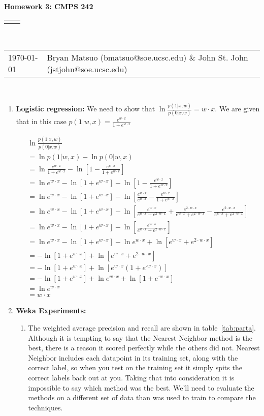 \documentclass[12pt]{article}
\renewcommand{\title}[1]{\textbf{#1}\\}
\renewcommand{\line}{\begin{tabularx}{\textwidth}{X>{\raggedleft}X}\hline\\\end{tabularx}\\[-0.5cm]}
\newcommand{\leftright}[2]{\begin{tabularx}{\textwidth}{X>{\raggedleft}X}#1%
& #2\\\end{tabularx}\\[-0.5cm]}
\begin{document}
\title{Homework 3: CMPS 242}
\line
\leftright{\today}{Bryan Matsuo (bmatsuo@soe.ucsc.edu) \& John St. John (jstjohn@soe.ucsc.edu)} %
\begin{enumerate}
\item \textbf{Logistic regression:}
We need to show that $\ln \frac{p(1|x,w)}{p(0|x.w)}=w\cdot x$. We are given that in this case $p(1|w,x) = \frac{e^{w\cdot x}}{1+e^{w \cdot x}}$

\begin{eqnarray*}
\ln \frac{p(1|x,w)}{p(0|x.w)} \\
= \ln p(1|w,x) - \ln p(0|w,x) \\
=  \ln \frac{e^{w\cdot x}}{1+e^{w \cdot x}} - \ln \left[ 1-\frac{e^{w\cdot x}}{1+e^{w \cdot x}}\right] \\
=\ln e^{w\cdot x} - \ln \left[ 1 + e^{w\cdot x} \right] -\ln \left[ 1-\frac{e^{w\cdot x}}{1+e^{w \cdot x}}\right] \\
=\ln e^{w\cdot x} - \ln \left[ 1 + e^{w\cdot x} \right] -\ln \left[ \frac{e^{w\cdot x}}{e^{w\cdot x}}-\frac{e^{w\cdot x}}{1+e^{w \cdot x}}\right] \\
=\ln e^{w\cdot x} - \ln \left[ 1 + e^{w\cdot x} \right] -\ln \left[ \frac{e^{w\cdot x}}{e^{w\cdot x}+e^{2\cdot w\cdot x}}+ \frac{e^{2\cdot w\cdot x}}{e^{w\cdot x}+e^{2\cdot w\cdot x}}-\frac{e^{2\cdot w\cdot x}}{e^{w\cdot x}+e^{2\cdot w\cdot x}}\right] \\
=\ln e^{w\cdot x} - \ln \left[ 1 + e^{w\cdot x} \right] -\ln \left[ \frac{e^{w\cdot x}}{e^{w\cdot x}+e^{2\cdot w\cdot x}}\right] \\
=\ln e^{w\cdot x} - \ln \left[ 1 + e^{w\cdot x} \right] -\ln e^{w\cdot x} + \ln \left[ e^{w\cdot x}+e^{2\cdot w\cdot x} \right] \\
= - \ln \left[ 1 + e^{w\cdot x} \right] +  \ln \left[ e^{w\cdot x}+e^{2\cdot w\cdot x} \right] \\
= - \ln \left[ 1 + e^{w\cdot x} \right] + \ln \left[ e^{w\cdot x}\left(1+e^{\cdot w\cdot x}\right) \right]\\
= - \ln \left[ 1 + e^{w\cdot x} \right] + \ln e^{w\cdot x} + \ln \left[1+e^{\cdot w\cdot x}\right] \\
=\ln e^{w\cdot x}\\
= w\cdot x
\end{eqnarray*}


\item \textbf{Weka Experiments: }

\begin{enumerate}
\item %
The weighted average precision and recall are shown in table~\ref{tab:parta}. Although it is tempting to say that the Nearest Neighbor method is the best, there is a reason it scored perfectly while the others did not. Nearest Neighbor includes each datapoint in its training set, along with the correct label, so when you test on the training set it simply spits the correct labels back out at you. Taking that into consideration it is impossible to say which method was the best. We'll need to evaluate the methods on a different set of data than was used to train to compare the techniques.



\end{enumerate}
\end{enumerate}
\end{document}
